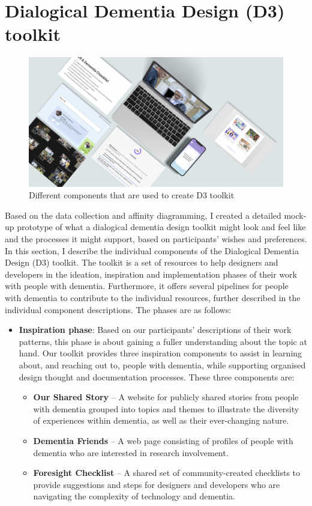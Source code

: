 \section{Dialogical Dementia Design (D3) toolkit}
\label{D3:Toolit}

\begin{figure}[h]
\centering
\includegraphics[width=1\linewidth]{Images/D3Toolkit/Fig4.png}
\caption{Different components that are used to create D3 toolkit}
\label{fig:D3Overview}
\end{figure}
Based on the data collection and affinity diagramming, I created a detailed mock-up prototype of what a dialogical dementia design toolkit might look and feel like and the processes it might support, based on participants’ wishes and preferences. In this section, I describe the individual components of the Dialogical Dementia Design (D3) toolkit. The toolkit is a set of resources to help designers and developers in the ideation, inspiration and implementation phases of their work with people with dementia. Furthermore, it offers several pipelines for people with dementia to contribute to the individual resources, further described in the individual component descriptions. The phases are as follows:

\begin{itemize}
    \item 
\textbf{Inspiration phase}: Based on our participants’ descriptions of their work patterns, this phase is about gaining a fuller understanding about the topic at hand. Our toolkit provides three inspiration components to assist in learning about, and reaching out to, people with dementia, while supporting organised design thought and documentation processes. These three components are:
\begin{itemize}
    \item \textbf{Our Shared Story }– A website for publicly shared stories from people with dementia grouped into topics and themes to illustrate the diversity of experiences within dementia, as well as their ever-changing nature.
    \item \textbf{Dementia Friends} – A web page consisting of profiles of people with dementia who are interested in research involvement. 
    \item \textbf{Foresight Checklist }– A shared set of community-created checklists to provide suggestions and steps for designers and developers who are navigating the complexity of technology and dementia.
\end{itemize}
\end{itemize}

